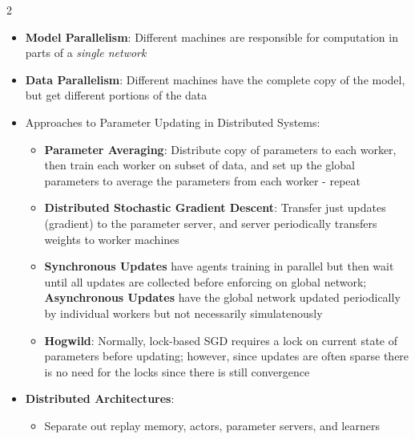 \documentclass{article}
\makeatletter
\providecommand{\tightlist}{%
  \setlength{\itemsep}{\GlobalItemSep}\setlength{\parskip}{\GlobalListParSkip}}
\newcommand{\SectionFontStyle}{\fontsize{6.4}{7.2}\selectfont\bfseries}
\newlength{\SectionBeforeSkip}
\newlength{\SectionAfterSkip}
\newlength{\GlobalItemSep}
\newlength{\GlobalListParSkip}
\renewcommand\section{\@startsection{section}{1}{\z@}{\SectionBeforeSkip}{\SectionAfterSkip}{\normalfont\SectionFontStyle}}
\makeatother
\begin{document}
\begin{multicols}{2}
\section{System Design}\label{system-design}

\begin{itemize}
\tightlist
\item
  \textbf{Model Parallelism}: Different machines are responsible for
  computation in parts of a \emph{single network}
\item
  \textbf{Data Parallelism}: Different machines have the complete copy
  of the model, but get different portions of the data
\item
  Approaches to Parameter Updating in Distributed Systems:

  \begin{itemize}
  \tightlist
  \item
    \textbf{Parameter Averaging}: Distribute copy of parameters to each
    worker, then train each worker on subset of data, and set up the
    global parameters to average the parameters from each worker -
    repeat
  \item
    \textbf{Distributed Stochastic Gradient Descent}: Transfer just
    updates (gradient) to the parameter server, and server periodically
    transfers weights to worker machines
  \item
    \textbf{Synchronous Updates} have agents training in parallel but
    then wait until all updates are collected before enforcing on global
    network; \textbf{Asynchronous Updates} have the global network
    updated periodically by individual workers but not necessarily
    simulatenously
  \item
    \textbf{Hogwild}: Normally, lock-based SGD requires a lock on
    current state of parameters before updating; however, since updates
    are often sparse there is no need for the locks since there is still
    convergence
  \end{itemize}
\item
  \textbf{Distributed Architectures}:

  \begin{itemize}
  \tightlist
  \item
    Separate out replay memory, actors, parameter servers, and learners
  \end{itemize}
\end{itemize}

\end{multicols}
\end{document}
